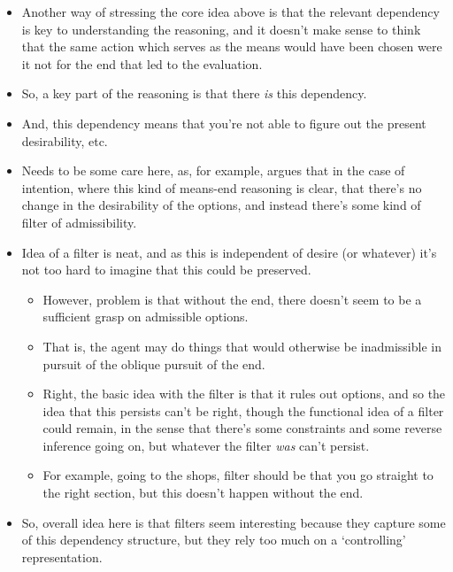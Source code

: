 \documentclass[10pt]{article}
\begin{document}
\begin{itemize}
\item Another way of stressing the core idea above is that the relevant dependency is key to understanding the reasoning, and it doesn't make sense to think that the same action which serves as the means would have been chosen were it not for the end that led to the evaluation.
\item So, a key part of the reasoning is that there \emph{is} this dependency.
\item And, this dependency means that you're not able to figure out the present desirability, etc.
\item Needs to be some care here, as, for example, \citeauthor{Bratman:1987aa} argues that in the case of intention, where this kind of means-end reasoning is clear, that there's no change in the desirability of the options, and instead there's some kind of filter of admissibility.
\item Idea of a filter is neat, and as this is independent of desire (or whatever) it's not too hard to imagine that this could be preserved.
  \begin{itemize}
  \item However, problem is that without the end, there doesn't seem to be a sufficient grasp on admissible options.
  \item That is, the agent may do things that would otherwise be inadmissible in pursuit of the oblique pursuit of the end.
  \item Right, the basic idea with the filter is that it rules out options, and so the idea that this persists can't be right, though the functional idea of a filter could remain, in the sense that there's some constraints and some reverse inference going on, but whatever the filter \emph{was} can't persist.
  \item For example, going to the shops, filter should be that you go straight to the right section, but this doesn't happen without the end.
  \end{itemize}
\item So, overall idea here is that filters seem interesting because they capture some of this dependency structure, but they rely too much on a `controlling' representation.
\end{itemize}
\end{document}
